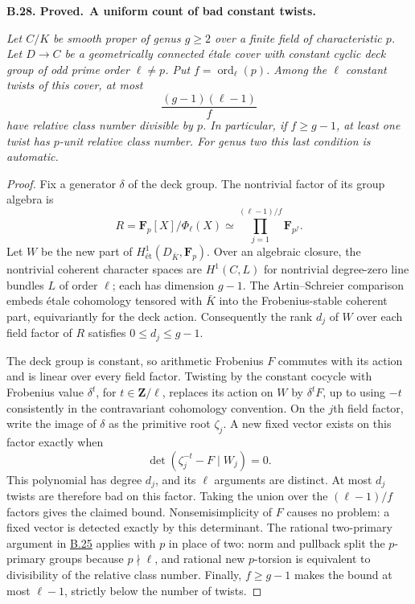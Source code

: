 \documentclass[11pt,a4paper]{article}
\newcommand{\et}{\text{ét}}
\newenvironment{claim}[3]{\par\medskip\noindent\hypertarget{#1}{\textbf{#1. #2.}}\ \textbf{#3.}\par\nopagebreak\smallskip\begingroup\itshape}{\endgroup\par\smallskip}
\newcommand{\statementref}[1]{\hyperlink{#1}{#1}}
\begin{document}
\begin{claim}{B.28}{Proved}{A uniform count of bad constant twists}
Let $C/K$ be smooth proper of genus $g\ge2$ over a finite field
of characteristic $p$. Let $D\to C$ be a geometrically connected
\emph{\'etale} cover with constant cyclic deck group of odd prime
order $\ell\ne p$. Put $f=\operatorname{ord}_\ell(p)$.
Among the $\ell$ constant twists of this cover, at most
\[
                \frac{(g-1)(\ell-1)}{f}
\]
have relative class number divisible by $p$. In particular, if
$f\ge g-1$, at least one twist has $p$-unit relative class number.
For genus two this last condition is automatic.
\end{claim}
\begin{proof}
Fix a generator $\delta$ of the deck group. The nontrivial factor
of its group algebra is
\[
 R=\mathbf F_p[X]/\Phi_\ell(X)
       \simeq\prod_{j=1}^{(\ell-1)/f}\mathbf F_{p^f}.
\]
Let $W$ be the new part of
$H^1_{\et}(D_{\bar K},\mathbf F_p)$. Over an algebraic closure,
the nontrivial coherent character spaces are $H^1(C,L)$ for
nontrivial degree-zero line bundles $L$ of order $\ell$; each
has dimension $g-1$. The Artin--Schreier comparison embeds
\'etale cohomology tensored with $\bar K$ into the Frobenius-stable
coherent part, equivariantly for the deck action. Consequently the rank $d_j$ of $W$ over each field
factor of $R$ satisfies $0\le d_j\le g-1$.

The deck group is constant, so arithmetic Frobenius $F$ commutes
with its action and is linear over every field factor. Twisting
by the constant cocycle with Frobenius value $\delta^t$, for
$t\in\mathbf Z/\ell$, replaces its action on $W$ by
$\delta^tF$, up to using $-t$ consistently in the contravariant
cohomology convention. On the $j$th field factor, write the image
of $\delta$ as the primitive root $\zeta_j$. A new fixed vector
exists on this factor exactly when
\[
               \det(\zeta_j^{-t}-F\mid W_j)=0.
\]
This polynomial has degree $d_j$, and its $\ell$ arguments are
distinct. At most $d_j$ twists are therefore bad on this factor.
Taking the union over the $(\ell-1)/f$ factors gives the claimed
bound. Nonsemisimplicity of $F$ causes no problem: a fixed vector
is detected exactly by this determinant. The rational two-primary
argument in \statementref{B.25} applies with $p$ in place of two:
norm and pullback split the $p$-primary groups because
$p\nmid\ell$, and rational new $p$-torsion is equivalent to
divisibility of the relative class number. Finally,
$f\ge g-1$ makes the bound at most $\ell-1$, strictly below the
number of twists.
\end{proof}
\end{document}
